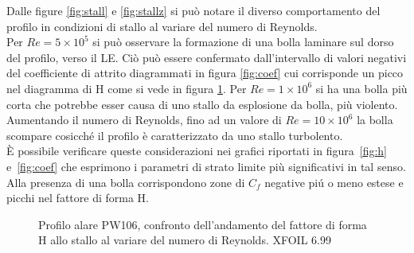 Dalle figure  \ref{fig:stall} e  \ref{fig:stallz} si può notare il diverso comportamento del profilo in condizioni di stallo al variare del numero di Reynolds. \\Per $Re=5\times10^5$ si può osservare la formazione di una bolla laminare sul dorso del profilo, verso il LE. %
Ciò può essere confermato dall’intervallo di valori negativi del coefficiente di attrito diagrammati in figura \ref{fig:coef} cui corrisponde un picco nel diagramma di H come si vede in figura \ref{fig:h}.
Per $Re=1\times10^6$ si ha una bolla più corta che potrebbe esser causa di uno stallo da esplosione da bolla, più violento. Aumentando il numero di Reynolds, fino ad un valore di $Re=10\times10^6$ la bolla scompare cosicché il profilo è caratterizzato da uno stallo turbolento.\\
È possibile verificare queste considerazioni nei grafici  riportati in figura~\vref{fig:h} e~\vref{fig:coef} che esprimono i parametri di strato limite più significativi in tal senso. Alla presenza di una bolla corrispondono zone di $C_f$  negative piú o meno estese e picchi nel fattore di forma H.
%



\begin{figure} [H]
\centering
{}
\caption{\footnotesize Profilo alare PW106, confronto dell'andamento del fattore di forma H allo stallo al variare del numero di Reynolds. XFOIL 6.99}
\label{fig:h}
\end{figure}
\noindent


